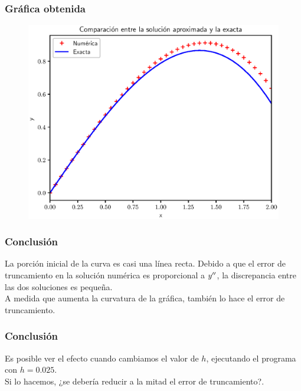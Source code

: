 \documentclass[12pt]{beamer}
\begin{document}
\begin{frame}
\frametitle{Gráfica obtenida}
\begin{figure}
	\centering
	\includegraphics[scale=0.55]{Imagenes/plot_euler_ejercicio_02.eps}
\end{figure}
\end{frame}
\begin{frame}
\frametitle{Conclusión}
La porción inicial de la curva es casi una línea recta. \pause Debido a que el error de truncamiento en la solución numérica es proporcional a ${y}^{\prime \prime}$, \pause la discrepancia entre las dos soluciones es pequeña.
\\
\bigskip
\pause
A medida que aumenta la curvatura de la gráfica, también lo hace el error de truncamiento.
\end{frame}
\begin{frame}
\frametitle{Conclusión}
Es posible ver el efecto cuando cambiamos el valor de $h$, \pause ejecutando el programa con $h = 0.025$.
\\
\bigskip
\pause
Si lo hacemos, \pause \textcolor{carmine}{¿se debería reducir a la mitad el error de truncamiento?}.
\end{frame}
\end{document}
